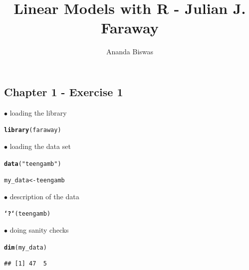 \documentclass[11pt, a4paper]{article}\usepackage[]{graphicx}\usepackage[]{xcolor}
\title{Linear Models with R - Julian J. Faraway}
\author{Ananda Biswas}
\date{}
\makeatletter
\newcommand{\hlstr}[1]{\textcolor[rgb]{0.192,0.494,0.8}{#1}}%
\newcommand{\hlstd}[1]{\textcolor[rgb]{0.345,0.345,0.345}{#1}}%
\newcommand{\hlkwb}[1]{\textcolor[rgb]{0.69,0.353,0.396}{#1}}%
\newcommand{\hlkwd}[1]{\textcolor[rgb]{0.737,0.353,0.396}{\textbf{#1}}}%
\newenvironment{kframe}{%
 \def\at@end@of@kframe{}%
 \ifinner\ifhmode%
  \def\at@end@of@kframe{\end{minipage}}%
  \begin{minipage}{\columnwidth}%
 \fi\fi%
 \def\FrameCommand##1{\hskip\@totalleftmargin \hskip-\fboxsep
 \colorbox{shadecolor}{##1}\hskip-\fboxsep
     \hskip-\linewidth \hskip-\@totalleftmargin \hskip\columnwidth}%
 \MakeFramed {\advance\hsize-\width
   \@totalleftmargin\z@ \linewidth\hsize
   \@setminipage}}%
 {\par\unskip\endMakeFramed%
 \at@end@of@kframe}
\newenvironment{knitrout}{}{} %
\makeatother
\begin{document}
\maketitle

\begin{center}
  \section*{Chapter 1 - Exercise 1}
\end{center}



$\bullet$ loading the library
\begin{knitrout}
\color{fgcolor}\begin{kframe}
\begin{alltt}
\hlkwd{library}\hlstd{(faraway)}
\end{alltt}


{\ttfamily\noindent\color{warningcolor}{\#\# Warning: package 'faraway' was built under R version 4.2.3}}\end{kframe}
\end{knitrout}

$\bullet$ loading the data set
\begin{knitrout}
\color{fgcolor}\begin{kframe}
\begin{alltt}
\hlkwd{data}\hlstd{(}\hlstr{"teengamb"}\hlstd{)}

\hlstd{my_data} \hlkwb{<-} \hlstd{teengamb}
\end{alltt}
\end{kframe}
\end{knitrout}

$\bullet$ description of the data
\begin{knitrout}
\color{fgcolor}\begin{kframe}
\begin{alltt}
\hlkwd{`?`}\hlstd{(teengamb)}
\end{alltt}


{\ttfamily\noindent\itshape\color{messagecolor}{\#\# starting httpd help server ... done}}\end{kframe}
\end{knitrout}

$\bullet$ doing sanity checks
\begin{knitrout}
\color{fgcolor}\begin{kframe}
\begin{alltt}
\hlkwd{dim}\hlstd{(my_data)}
\end{alltt}
\begin{verbatim}
## [1] 47  5
\end{verbatim}
\end{kframe}
\end{knitrout}
\end{document}
